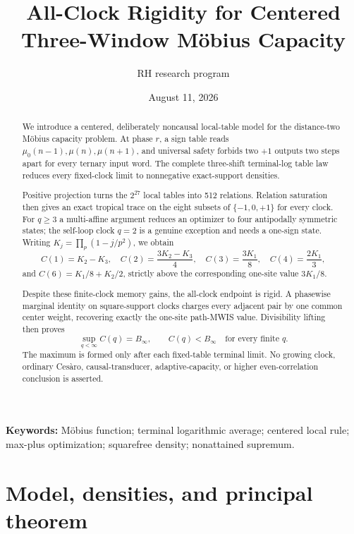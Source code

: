 \documentclass[11pt]{article}
\title{All-Clock Rigidity for Centered Three-Window M\"obius Capacity}
\author{RH research program}
\date{August 11, 2026}
\theoremstyle{definition}
\theoremstyle{remark}
\newcommand{\mob}{\mu}
\begin{document}
\maketitle

\begin{abstract}
We introduce a centered, deliberately noncausal local-table model for the
distance-two M\"obius capacity problem.  At phase \(r\), a sign table reads
\(\mob_0(n-1),\mob(n),\mob(n+1)\), and universal safety forbids two
\(+1\) outputs two steps apart for every ternary input word.  The complete
three-shift terminal-log table law reduces every fixed-clock limit to
nonnegative exact-support densities.

Positive projection turns the \(2^{27}\) local tables into 512 relations.
Relation saturation then gives an exact tropical trace on the eight subsets
of \(\{-1,0,+1\}\) for every clock.  For \(q\geq3\) a multi-affine argument
reduces an optimizer to four antipodally symmetric states; the self-loop
clock \(q=2\) is a genuine exception and needs a one-sign state.  Writing
\(K_j=\prod_p(1-j/p^2)\), we obtain
\[
 C(1)=K_2-K_3,\quad C(2)=\frac{3K_2-K_3}{4},\quad
 C(3)=\frac{3K_1}{8},\quad C(4)=\frac{2K_1}{3},
\]
and \(C(6)=K_1/8+K_2/2\), strictly above the corresponding one-site
value \(3K_1/8\).

Despite these finite-clock memory gains, the all-clock endpoint is rigid.
A phasewise marginal identity on square-support clocks charges every
adjacent pair by one common center weight, recovering exactly the one-site
path-MWIS value.  Divisibility lifting then proves
\[
 \sup_{q<\infty}C(q)=B_\infty,\qquad C(q)<B_\infty
 \quad\text{for every finite }q.
\]
The maximum is formed only after each fixed-table terminal limit.  No
growing clock, ordinary Ces\`aro, causal-transducer, adaptive-capacity, or
higher even-correlation conclusion is asserted.
\end{abstract}

\noindent\textbf{Keywords:} M\"obius function; terminal logarithmic average;
centered local rule; max-plus optimization; squarefree density; nonattained
supremum.

\section{Model, densities, and principal theorem}
\end{document}
